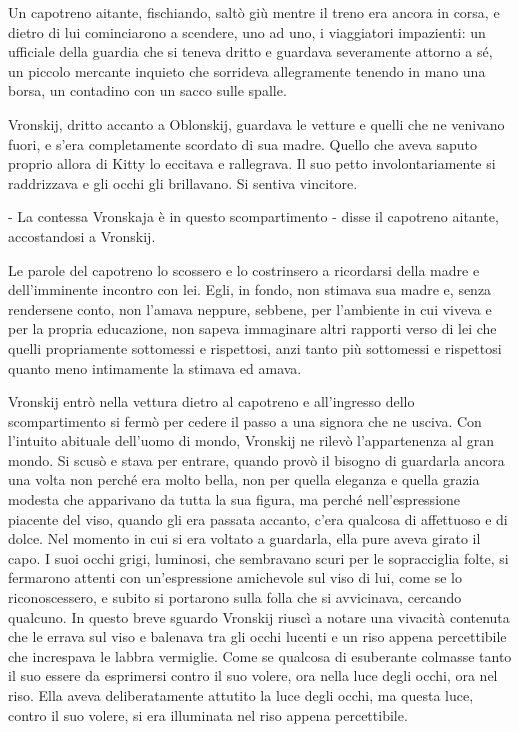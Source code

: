Un capotreno aitante, fischiando, saltò giù mentre il treno era ancora in corsa, e dietro di lui cominciarono a scendere, uno ad uno, i viaggiatori impazienti: un ufficiale della guardia che si teneva dritto e guardava severamente attorno a sé, un piccolo mercante inquieto che sorrideva allegramente tenendo in mano una borsa, un contadino con un sacco sulle spalle. 

Vronskij, dritto accanto a Oblonskij, guardava le vetture e quelli che ne venivano fuori, e s'era completamente scordato di sua madre. Quello che aveva saputo proprio allora di Kitty lo eccitava e rallegrava. Il suo petto involontariamente si raddrizzava e gli occhi gli brillavano. Si sentiva vincitore. 

- La contessa Vronskaja è in questo scompartimento - disse il capotreno aitante, accostandosi a Vronskij. 

Le parole del capotreno lo scossero e lo costrinsero a ricordarsi della madre e dell'imminente incontro con lei. Egli, in fondo, non stimava sua madre e, senza rendersene conto, non l'amava neppure, sebbene, per l'ambiente in cui viveva e per la propria educazione, non sapeva immaginare altri rapporti verso di lei che quelli propriamente sottomessi e rispettosi, anzi tanto più sottomessi e rispettosi quanto meno intimamente la stimava ed amava. 

\label{xviii} 

Vronskij entrò nella vettura dietro al capotreno e all'ingresso dello scompartimento si fermò per cedere il passo a una signora che ne usciva. Con l'intuito abituale dell'uomo di mondo, Vronskij ne rilevò l'appartenenza al gran mondo. Si scusò e stava per entrare, quando provò il bisogno di guardarla ancora una volta non perché era molto bella, non per quella eleganza e quella grazia modesta che apparivano da tutta la sua figura, ma perché nell'espressione piacente del viso, quando gli era passata accanto, c'era qualcosa di affettuoso e di dolce. Nel momento in cui si era voltato a guardarla, ella pure aveva girato il capo. I suoi occhi grigi, luminosi, che sembravano scuri per le sopracciglia folte, si fermarono attenti con un'espressione amichevole sul viso di lui, come se lo riconoscessero, e subito si portarono sulla folla che si avvicinava, cercando qualcuno. In questo breve sguardo Vronskij riuscì a notare una vivacità contenuta che le errava sul viso e balenava tra gli occhi lucenti e un riso appena percettibile che increspava le labbra vermiglie. Come se qualcosa di esuberante colmasse tanto il suo essere da esprimersi contro il suo volere, ora nella luce degli occhi, ora nel riso. Ella aveva deliberatamente attutito la luce degli occhi, ma questa luce, contro il suo volere, si era illuminata nel riso appena percettibile. 

